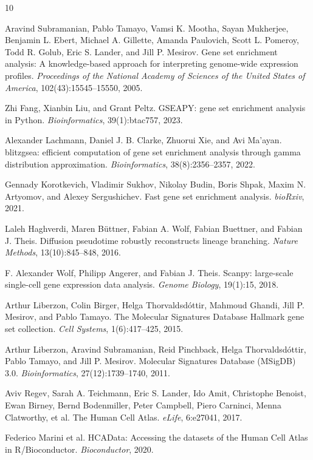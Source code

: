\begin{thebibliography}{10}

Aravind Subramanian, Pablo Tamayo, Vamsi K. Mootha, Sayan Mukherjee, Benjamin L. Ebert, Michael A. Gillette, Amanda Paulovich, Scott L. Pomeroy, Todd R. Golub, Eric S. Lander, and Jill P. Mesirov.
Gene set enrichment analysis: A knowledge-based approach for interpreting genome-wide expression profiles.
\emph{Proceedings of the National Academy of Sciences of the United States of America}, 102(43):15545--15550, 2005.

Zhi Fang, Xianbin Liu, and Grant Peltz.
GSEAPY: gene set enrichment analysis in Python.
\emph{Bioinformatics}, 39(1):btac757, 2023.

Alexander Lachmann, Daniel J. B. Clarke, Zhuorui Xie, and Avi Ma'ayan.
blitzgsea: efficient computation of gene set enrichment analysis through gamma distribution approximation.
\emph{Bioinformatics}, 38(8):2356--2357, 2022.

Gennady Korotkevich, Vladimir Sukhov, Nikolay Budin, Boris Shpak, Maxim N. Artyomov, and Alexey Sergushichev.
Fast gene set enrichment analysis.
\emph{bioRxiv}, 2021.

Laleh Haghverdi, Maren B\"uttner, Fabian A. Wolf, Fabian Buettner, and Fabian J. Theis.
Diffusion pseudotime robustly reconstructs lineage branching.
\emph{Nature Methods}, 13(10):845--848, 2016.

F. Alexander Wolf, Philipp Angerer, and Fabian J. Theis.
Scanpy: large-scale single-cell gene expression data analysis.
\emph{Genome Biology}, 19(1):15, 2018.

Arthur Liberzon, Colin Birger, Helga Thorvaldsd\'ottir, Mahmoud Ghandi, Jill P. Mesirov, and Pablo Tamayo.
The Molecular Signatures Database Hallmark gene set collection.
\emph{Cell Systems}, 1(6):417--425, 2015.

Arthur Liberzon, Aravind Subramanian, Reid Pinchback, Helga Thorvaldsd\'ottir, Pablo Tamayo, and Jill P. Mesirov.
Molecular Signatures Database (MSigDB) 3.0.
\emph{Bioinformatics}, 27(12):1739--1740, 2011.

Aviv Regev, Sarah A. Teichmann, Eric S. Lander, Ido Amit, Christophe Benoist, Ewan Birney, Bernd Bodenmiller, Peter Campbell, Piero Carninci, Menna Clatworthy, et al.
The Human Cell Atlas.
\emph{eLife}, 6:e27041, 2017.

Federico Marini et al.
HCAData: Accessing the datasets of the Human Cell Atlas in R/Bioconductor.
\emph{Bioconductor}, 2020.

\end{thebibliography}
